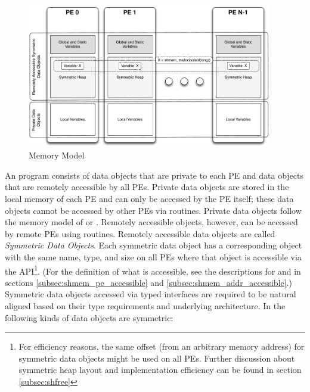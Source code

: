 \begin{figure}[h]
\includegraphics[width=0.95\textwidth]{figures/mem_model}      
\caption{\openshmem Memory Model}
\label{fig:mem_model}                                               
\end{figure}      
%
An \openshmem program consists of data objects that are private to each \ac{PE}
 and data  objects that are remotely accessible by all
 \acp{PE}. Private data objects  
are stored in the local memory of each \ac{PE} and can only be accessed
by the \ac{PE} itself; these data objects cannot be accessed by other \acp{PE}
via \openshmem routines. Private data objects follow the memory model of
\Cstd or \Fortran. Remotely accessible objects, however, can be accessed by
remote \acp{PE} using \openshmem routines.  Remotely accessible data objects are
called \emph{Symmetric Data Objects}.  Each symmetric data 
object has a corresponding object with the same name, type, and size on all PEs where that 
object is accessible via the \openshmem \ac{API}\footnote{For efficiency reasons,
the same offset (from an arbitrary memory address) for symmetric data
objects might be used on all \acp{PE}. Further discussion about symmetric heap
layout and implementation efficiency can be found in section
\ref{subsec:shfree}}.  (For the definition of what is accessible, see the
descriptions for  and 
in sections \ref{subsec:shmem_pe_accessible} and
\ref{subsec:shmem_addr_accessible}.) Symmetric data objects accessed via typed
\openshmem interfaces are required to be natural aligned based on their type
requirements and underlying architecture.  In \openshmem the following kinds of
data objects are symmetric:
%
